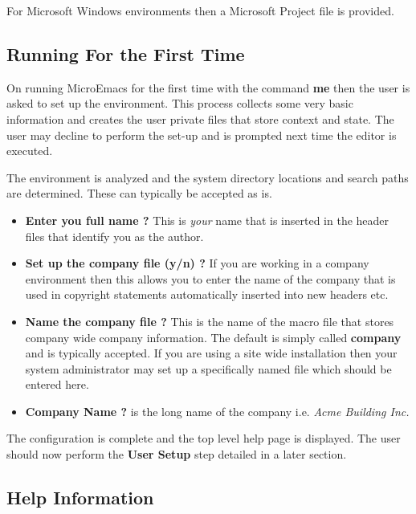 \documentclass[11pt,a4paper,pdftex]{article}
\begin{document}
  For Microsoft Windows environments then a Microsoft Project file is
  provided.

\subsection{Running For the First Time}

  On running MicroEmacs for the first time with the command \textbf{me} then
  the user is asked to set up the environment. This process collects some very
  basic information and creates the user private files that store context and
  state. The user may decline to perform the set-up and is prompted next time
  the editor is executed.

  The environment is analyzed and the system directory locations and search
  paths are determined. These can typically be accepted as is.

  \begin{itemize}

    \item \textbf{Enter you full name ?} This is \textit{your} name that is
    inserted in the header files that identify you as the author.

    \item \textbf{Set up the company file (y/n) ?} If you are working in a
    company environment then this allows you to enter the name of the company
    that is used in copyright statements automatically inserted into new
    headers etc.

    \item \textbf{Name the company file ?} This is the name of the macro file
    that stores company wide company information. The default is simply called
    \textbf{company} and is typically accepted. If you are using a site wide
    installation then your system administrator may set up a specifically
    named file which should be entered here.

    \item \textbf{Company Name ?} is the long name of the company i.e.
    \textit{Acme Building Inc.}

  \end{itemize}

  The configuration is complete and the top level help page is displayed. The
  user should now perform the \textbf{User Setup} step detailed in a later
  section.

\subsection{Help Information}
\end{document}
